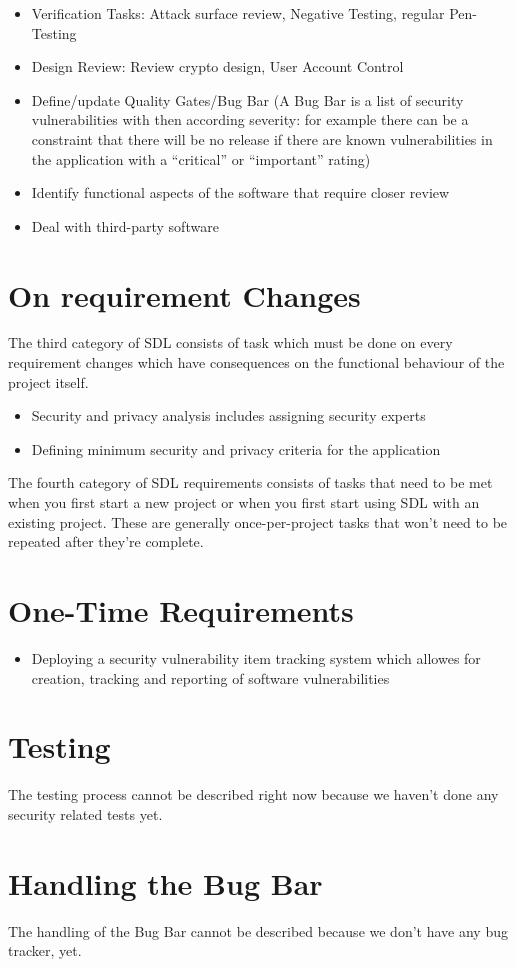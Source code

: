 \begin{itemize}
	\item Verification Tasks: Attack surface review, Negative Testing, regular Pen-Testing
	\item Design Review: Review crypto design, User Account Control
	\item Define/update Quality Gates/Bug Bar (A Bug Bar is a list of security vulnerabilities with then according severity: for example there can be a constraint that there will be no release if there are known vulnerabilities in the application with a ``critical'' or ``important'' rating)
	\item Identify functional aspects of the software that require closer review
	\item Deal with third-party software
\end{itemize}

\section{On requirement Changes}

The third category of SDL consists of task which must be done on every requirement changes which have consequences on the functional behaviour of the project itself. 

\begin{itemize}
	\item Security and privacy analysis includes assigning security experts
	\item Defining minimum security and privacy criteria for the application
\end{itemize}

The fourth category of SDL requirements consists of tasks that need to be met when you first start a new project or when you first start using SDL with an existing project. These are generally once-per-project tasks that won’t need to be repeated after they’re complete.

\section{One-Time Requirements}
\begin{itemize}
	\item Deploying a security vulnerability item tracking system which allowes for creation, tracking and reporting of software vulnerabilities
\end{itemize}

\section{Testing}

The testing process cannot be described right now because we haven't done any security related tests yet. 

\section{Handling the Bug Bar}

The handling of the Bug Bar cannot be described because we don't have any bug tracker, yet.
